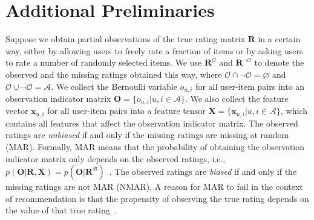 \documentclass[letterpaper]{article} %
\newcommand{\matrixize}[1]{\mathbf{#1}}
\newcommand{\vectorize}[1]{\bm{#1}}
\newcommand{\lrdense}[2]{\smashoperator[lr]{#1_{#2}}}
\newcommand{\nUser}{M}
\newcommand{\nItem}{N}
\newcommand{\allPairs}{\mathcal{A}}
\newcommand{\obsPairs}{\mathcal{O}}
\newcommand{\misPairs}{{\lnot\mathcal{O}}}
\newcommand{\obsBiasedPairs}{\mathcal{B}}
\newcommand{\misBiasedPairs}{{\lnot\mathcal{B}}}
\newcommand{\obsUnbiasedPairs}{\mathcal{U}}
\newcommand{\trueRatings}{\matrixize{R}}
\newcommand{\biasedRating}{r_{u,i}}
\newcommand{\ratingScale}{r}
\newcommand{\nScale}{R}
\newcommand{\observations}{\matrixize{O}}
\newcommand{\obsIndicator}{o}
\newcommand{\observation}{\obsIndicator_{u,i}}
\newcommand{\allFeatures}{\matrixize{X}}
\newcommand{\featureMark}{x}
\newcommand{\biasedFeatures}{\vectorize{\featureMark}_{u,i}}
\newcommand{\likelihood}[1]{\mathcal{F}_{\rm #1}}
\newcommand{\nbProbability}{p}
\newcommand{\nbObservation}{\nbProbability}
\newcommand{\nbCondition}{\nbProbability}
\newcommand{\nbRating}{\nbProbability}
\newcommand{\propensityParam}{\theta}
\begin{document}
\section{Additional Preliminaries}
\label{app:additional preliminaries}
Suppose we obtain partial observations of the true rating matrix  $\trueRatings$ in a certain way, either by allowing users to freely rate a fraction of items or by asking users to rate a number of randomly selected items.
We use $\trueRatings^\obsPairs$ and $\trueRatings^\misPairs$ to denote the observed and the missing ratings obtained this way, where $\obsPairs\cap\misPairs=\varnothing$ and $\obsPairs\cup\misPairs=\allPairs$.
We collect the Bernoulli variable $\observation$ for all user-item pairs into an observation indicator matrix $\observations=\{\observation|u,i\in\allPairs\}$.
We also collect the feature vector $\biasedFeatures$ for all user-item pairs into a feature tensor $\allFeatures=\{\biasedFeatures|u,i\in\allPairs\}$, which contains all features that affect the observation indicator matrix.
The observed ratings are \emph{unbiased} if and only if the missing ratings are missing at random (MAR).
Formally, MAR means that the probability of obtaining the observation indicator matrix only depends on the observed ratings, i.e., $p(\observations|\trueRatings,\allFeatures)=p(\observations|\trueRatings^{\obsBiasedPairs})$~\cite{marlin2007collaborative}.
The observed ratings are \emph{biased} if and only if the missing ratings are not MAR (NMAR).
A reason for MAR to fail in the context of recommendation is that the propensity of observing the true rating depends on the value of that true rating~\cite{marlin2009collaborative}.

\end{document}
